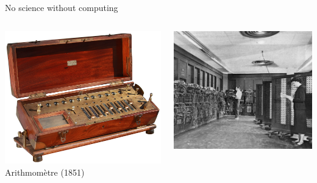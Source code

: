 \documentclass[10pt]{beamer}
\begin{document}
\begin{frame}{No science without computing}
    \begin{columns}
        \begin{column}[c]{.33\columnwidth}
            \includegraphics[width=\linewidth]{img/slides/arithmometer.png}
            Arithmomètre (1851)
        \end{column}
        \begin{column}[c]{.33\columnwidth}
            \includegraphics[width=\linewidth]{img/slides/eniac.jpg}

\end{column}
\end{columns}
\end{frame}
\end{document}
